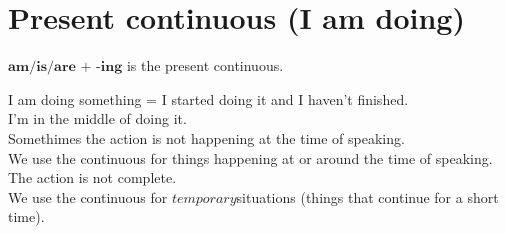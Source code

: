 \section{Present continuous (I am doing)}
\label{Present continuous}
$\textbf{am/is/are + -ing}$ is the present continuous.
I am doing something = I started doing it and I haven't finished.\\
I'm in the middle of doing it.\\
Somethimes the action is not happening at the time of speaking.\\
We use the continuous for things happening at or around the time of speaking.\\
The action is not complete.\\
We use the continuous for $\textit{temporary}$situations (things that continue for a short time). \\

